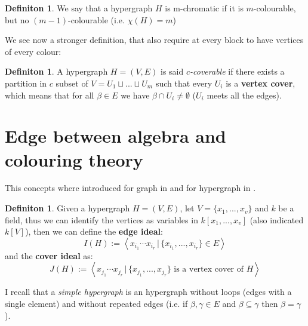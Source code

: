 \documentclass[notitlepage, a4]{book}
\theoremstyle{plain}
\theoremstyle{remark}
\theoremstyle{definition}
\newtheorem{deff}[teo]{Definiton}
\begin{document}
\begin{deff}
We say that a hypergraph $ H $ is m-chromatic if it is $ m $-colourable, but no $ (m-1) $-colourable (i.e. $\chi(H) = m  $)
\end{deff}

We see now a stronger definition, that also require at every block to have vertices of every colour:

\begin{deff} \label{def:cover}
A hypergraph $ H = (V,E) $ is said \textit{$ c $-coverable} if there exists a partition in $ c $ subset of $ V = U_1 \sqcup ... \sqcup U_m $ such that every $ U_i $ is a \textbf{vertex cover}, which means  that for all $ \beta \in E $ we have $ \beta \cap U_i \neq \emptyset $ ($ U_i $ meets all the edges). 
\end{deff}

\section{Edge between algebra and colouring theory}


This concepts where introduced for graph in \cite{Villa90} and for hypergraph in \cite{Ha08}.

\begin{deff}\label{def:edgecoverideal}
Given a hypergraph $ H = (V,E) $, let $ V = \{ x_1 , ... , x_v \} $ and $ k $ be a field, thus we can identify the vertices as variables in $ k[x_1 , ... , x_v] $ (also indicated $ k[V] $), then we can define the \textbf{edge ideal}:
\begin{equation}\label{eq:edgeideal}
I(H) := \left\langle x_{i_1} \cdots x_{i_r} \,|\, \{ x_{i_1} , ... , x_{i_r}\} \in E \right\rangle 
\end{equation}
and the \textbf{cover ideal} as:
\begin{equation}\label{eq:coverideal}
J(H) := \left\langle x_{j_1} \cdots x_{j_r} \,|\, \{ x_{j_1} , ... , x_{j_r}\} \text{ is a vertex cover of } H \right\rangle 
\end{equation}
\end{deff}

I recall that a \textit{simple hypergraph} is an hypergraph without loops (edges with a single element) and without repeated edges (i.e. if $ \beta, \gamma \in E$ and $ \beta \subseteq \gamma $ then $ \beta = \gamma $). 
\end{document}
